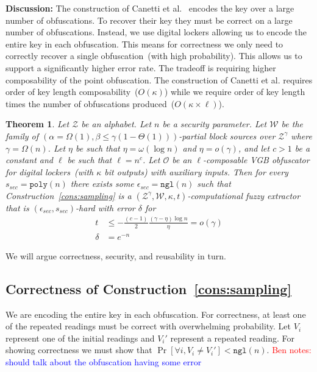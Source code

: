 \documentclass[11pt]{article}
\newcommand{\consref}[1]{\mbox{Construction~\ref{#1}}}
\newcommand{\poly}{\ensuremath{\mathtt{poly}}\xspace}
\newcommand{\ngl}{\ensuremath{\mathtt{ngl}}\xspace}
\newtheorem{theorem}{Theorem}[section]
\newcommand{\authnote}[2]{{\textcolor{red}{\textsf{#1 notes: }\textcolor{blue}{ #2}}\marginpar{\textcolor{red}{\textbf{!!!!!}}}}}
\newcommand{\authnote}[2]{}
\newcommand{\bnote}[1]{{\authnote{Ben}{#1}}}
\begin{document}
\textbf{Discussion:} The construction of Canetti et al.~\cite{canetti2014key} encodes the key over a large number of obfuscations.  To recover their key they must be correct on a large number of obfuscations.  Instead, we use digital lockers allowing us to encode the entire key in each obfuscation.  This means for correctness we only need to correctly recover a single obfuscation~(with high probability).  This allows us to support a significantly higher error rate.  The tradeoff is requiring higher composability of the point obfuscation.  The construction of Canetti et al. requires order of key length composability~($O(\kappa)$) while we require order of key length times the number of obfuscations produced~($O(\kappa\times \ell)$).

\begin{theorem}
\label{thm:sampling}
Let $\mathcal{Z}$ be an alphabet.  Let $n$ be a security parameter.  Let $\mathcal{W}$ be the family of $(\alpha = \Omega(1), \beta\leq \gamma(1-\Theta(1)))$-partial block sources over $\mathcal{Z}^\gamma$ where $\gamma =\Omega(n)$.  Let $\eta$ be such that $\eta = \omega(\log n)$ and $\eta = o(\gamma)$, and let $c> 1$ be a constant and $\ell$ be such that $\ell = n^c$.  Let $\mathcal{O}$ be an $\ell$-composable VGB obfuscator for digital lockers~(with $\kappa$ bit outputs) with auxiliary inputs.  Then for every $s_{sec} = \poly(n)$ there exists some $\epsilon_{sec} = \ngl(n)$ such that \consref{cons:sampling} is a $(\mathcal{Z}^\gamma, \mathcal{W}, \kappa, t)$-computational fuzzy extractor that is $(\epsilon_{sec}, s_{sec})$-hard with error $\delta$ for 
\begin{align*}
t&\leq -\frac{(c-1)}{2} \frac{(\gamma-\eta)\log n}{\eta} = o(\gamma)\\
\delta &= e^{-n}
\end{align*}
\end{theorem}

We will argue correctness, security, and reusability in turn.

\subsection{Correctness of \consref{cons:sampling}}
\label{sec:correct sampling}
We are encoding the entire key in each obfuscation.  For correctness, at least one of the repeated readings must be correct with overwhelming probability.  Let $V_i$ represent one of the initial readings and $V_i'$ represent a repeated reading.  For showing correctness we must show that $\Pr[\forall i, V_i \neq V_i'] < \ngl(n)$. \bnote{should talk about the obfuscation having some error}
\end{document}
